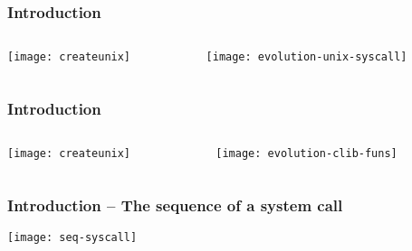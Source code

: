 \begin{frame}[plain]
	\frametitle{Introduction}
	
	
	
	\begin{columns}
		
		\begin{column}{.2\textwidth}
			
			\texttt{[image: createunix]}
			
		\end{column}
		
		\begin{column}{.8\textwidth}
			
			\texttt{[image: evolution-unix-syscall]}

		\end{column}
		
		
	\end{columns}
	
	
\end{frame}

\begin{frame}[plain]
	\frametitle{Introduction}
	
	
	
	\begin{columns}
		
		\begin{column}{.2\textwidth}
			
			\texttt{[image: createunix]}
			
		\end{column}
		
		\begin{column}{.8\textwidth}
			
			\texttt{[image: evolution-clib-funs]}
			
		\end{column}
		
		
	\end{columns}
	
	
\end{frame}

\begin{frame}[plain]
	\frametitle{Introduction -- The sequence of a system call}
	
	
	
			
			\texttt{[image: seq-syscall]}
			

	
\end{frame}


